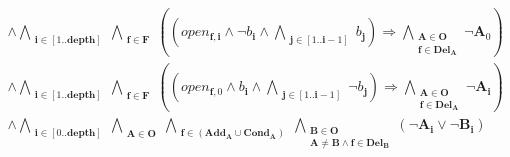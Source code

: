 \documentclass[fleqn]{article}
\begin{document}
\begin{multline*}
 \wedge \bigwedge\limits_{\substack{\mathbf{i}\in [1..\mathbf{depth}]}}\bigwedge\limits_{\substack{\mathbf{f}\in \mathbf{F}}}\left(\left(open_{\mathbf{f},\mathbf{i}} \wedge \neg b_{\mathbf{i}} \wedge \bigwedge\limits_{\substack{\mathbf{j}\in [1..\mathbf{i} - 1]}}b_{\mathbf{j}}\right) \Rightarrow \bigwedge\limits_{\substack{\mathbf{A}\in \mathbf{O}\\\mathbf{f} \in \mathbf{Del}_{\mathbf{A}}}}\neg \mathbf{A}_{0}\right)\\
 \wedge \bigwedge\limits_{\substack{\mathbf{i}\in [1..\mathbf{depth}]}}\bigwedge\limits_{\substack{\mathbf{f}\in \mathbf{F}}}\left(\left(open_{\mathbf{f},0} \wedge b_{\mathbf{i}} \wedge \bigwedge\limits_{\substack{\mathbf{j}\in [1..\mathbf{i} - 1]}}\neg b_{\mathbf{j}}\right) \Rightarrow \bigwedge\limits_{\substack{\mathbf{A}\in \mathbf{O}\\\mathbf{f} \in \mathbf{Del}_{\mathbf{A}}}}\neg \mathbf{A}_{\mathbf{i}}\right)\\
 \wedge \bigwedge\limits_{\substack{\mathbf{i}\in [0..\mathbf{depth}]}}\bigwedge\limits_{\substack{\mathbf{A}\in \mathbf{O}}}\bigwedge\limits_{\substack{\mathbf{f}\in \left(\mathbf{Add}_{\mathbf{A}}\cup\mathbf{Cond}_{\mathbf{A}}\right)}}\bigwedge\limits_{\substack{\mathbf{B}\in \mathbf{O}\\\mathbf{A} \neq \mathbf{B} \wedge \mathbf{f} \in \mathbf{Del}_{\mathbf{B}}}}\left(\neg \mathbf{A}_{\mathbf{i}} \vee \neg \mathbf{B}_{\mathbf{i}}\right)\\
\end{multline*}
\end{document}
